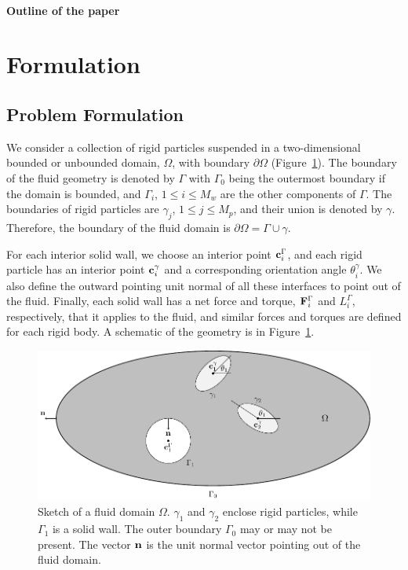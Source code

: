\documentclass[preprint, 10pt]{elsarticle}
\begin{document}
\paragraph{Outline of the paper}
\section{Formulation\label{s:formulation}} 
\subsection{Problem Formulation}

We consider a collection of rigid particles suspended in a
two-dimensional bounded or unbounded domain, $\Omega$, with boundary
$\partial\Omega$ (Figure~\ref{fig:geomSchematic}).  The boundary of the
fluid geometry is denoted by $\Gamma$ with $\Gamma_0$ being the
outermost boundary if the domain is bounded, and $\Gamma_i$, $1\leq i
\leq M_w$ are the other components of $\Gamma$.  The boundaries of rigid
particles are $\gamma_j$, $1\leq j\leq M_p$, and their union is denoted by
$\gamma$. Therefore, the boundary of the fluid domain is $ \partial\Omega
=\Gamma \cup \gamma$.
 
For each interior solid wall, we choose an interior point
${\mathbf{c}}^\Gamma_i$, and each rigid particle has an interior point
${\mathbf{c}}^\gamma_i$ and a corresponding orientation angle $\theta^\gamma_i$.
We also define the outward pointing unit normal of all these interfaces
to point out of the fluid. Finally, each solid wall has a net force and
torque, ${\mathbf{F}}^\Gamma_i$ and $L^\Gamma_i$, respectively, that it applies
to the fluid, and similar forces and torques are defined for each rigid
body.  A schematic of the geometry is in Figure~\ref{fig:geomSchematic}.

\begin{figure}[!h]
\begin{center}
\includegraphics{figures/multiply_connected.pdf}
\end{center}
\caption{\label{fig:geomSchematic}Sketch of a fluid domain $\Omega$.
$\gamma_1$ and $\gamma_2$ enclose rigid particles, while $\Gamma_1$ is a solid
wall. The outer boundary $\Gamma_0$ may or may not be present.  The vector
${\mathbf{n}}$ is the unit normal vector pointing out of the fluid domain.}
\end{figure}
\end{document}
